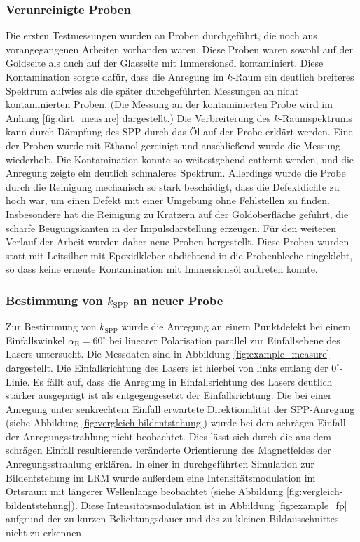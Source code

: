 \documentclass[titlepage,  ngerman]{article}
\begin{document}
	\subsubsection{Verunreinigte Proben}
	Die ersten Testmessungen wurden an Proben durchgeführt, die noch aus vorangegangenen Arbeiten vorhanden waren. Diese Proben waren sowohl auf der Goldseite als auch auf der Glasseite mit Immersionsöl kontaminiert. Diese Kontamination sorgte dafür, dass die Anregung im $k$-Raum ein deutlich breiteres Spektrum aufwies als die später durchgeführten Messungen an nicht kontaminierten Proben. (Die Messung an der kontaminierten Probe wird im Anhang \ref{fig:dirt_measure} dargestellt.) Die Verbreiterung des $k$-Raumspektrums kann durch Dämpfung des SPP durch das Öl auf der Probe erklärt werden. Eine der Proben wurde mit Ethanol gereinigt und anschließend wurde die Messung wiederholt. Die Kontamination konnte so weitestgehend entfernt werden, und die Anregung zeigte ein deutlich schmaleres Spektrum. Allerdings wurde die Probe durch die Reinigung mechanisch so stark beschädigt, dass die Defektdichte zu hoch war, um einen Defekt mit einer Umgebung ohne Fehlstellen zu finden. Insbesondere hat die Reinigung zu Kratzern auf der Goldoberfläche geführt, die scharfe Beugungskanten in der Impulsdarstellung  erzeugen. Für den weiteren Verlauf der Arbeit wurden daher neue Proben hergestellt. Diese Proben wurden statt mit Leitsilber mit Epoxidkleber abdichtend in die Probenbleche eingeklebt, so dass keine erneute Kontamination mit Immersionsöl auftreten konnte.
	\subsubsection{Bestimmung von  $k_{\mathrm{SPP}}$ an neuer Probe}
	Zur Bestimmung von $k_{\mathrm{SPP}}$ wurde die Anregung an einem Punktdefekt bei einem Einfallswinkel $\alpha_{\mathrm{E}} = 60^\circ$ bei linearer Polarisation parallel zur Einfallsebene des Lasers untersucht. Die Messdaten sind in Abbildung \ref{fig:example_measure} dargestellt. Die Einfallsrichtung des Lasers ist hierbei von links entlang der $0^\circ$-Linie. Es fällt auf, dass die Anregung in Einfallsrichtung des Lasers deutlich stärker ausgeprägt ist als entgegengesetzt der Einfallsrichtung. Die bei einer Anregung unter senkrechtem Einfall erwartete Direktionalität der SPP-Anregung (siehe Abbildung \ref{fig:vergleich-bildentstehung}) wurde bei dem schrägen Einfall der Anregungsstrahlung nicht beobachtet. Dies lässt sich durch die aus dem schrägen Einfall resultierende veränderte Orientierung des Magnetfeldes der Anregungsstrahlung erklären. In einer in \cite{Hohenau.2011} durchgeführten Simulation zur Bildentstehung im LRM wurde außerdem eine Intensitätsmodulation im Ortsraum mit längerer Wellenlänge beobachtet (siehe Abbildung \ref{fig:vergleich-bildentstehung}). Diese Intensitätsmodulation ist in Abbildung \ref{fig:example_fp} aufgrund der zu kurzen Belichtungsdauer und des zu kleinen Bildausschnittes nicht zu erkennen.
	
\end{document}
